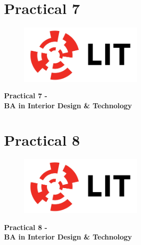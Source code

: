 \documentclass[a4paper, 10pt]{article}
\begin{document}

\newpage
\section{Practical 7}

\newpage
\setcounter{page}{1}
\begin{center}
	\begin{figure}[ht]
		\centering
		\includegraphics[width = 6cm]{img/LITlogo.jpg}
		\label{fig:logoa7}
	\end{figure}
	\Large\textbf{Practical 7 - }\\
	\large\textbf{BA in Interior Design \& Technology}
\end{center}	


\newpage
\section{Practical 8}

\newpage
\setcounter{page}{1}
\begin{center}
	\begin{figure}[ht]
		\centering
		\includegraphics[width = 6cm]{img/LITlogo.jpg}
		\label{fig:logoa8}
	\end{figure}
	\Large\textbf{Practical 8 - }\\
	\large\textbf{BA in Interior Design \& Technology}
\end{center}
\end{document}
